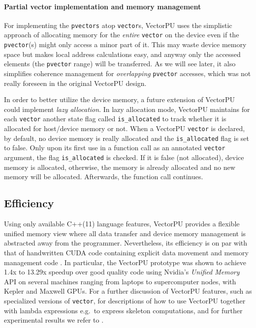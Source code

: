 \paragraph{Partial vector implementation and memory management}
For implementing the \texttt{pvectors} atop \texttt{vector}s, 
VectorPU uses the simplistic approach of allocating memory for
the \emph{entire} \texttt{vector} on the device 
even if the \texttt{pvector}(s) might only
access a minor part of it. This may waste device memory space 
but makes local address calculations easy, and anyway only
the accessed elements (the \texttt{pvector} range) will be transferred.
As we will see later, it also simplifies coherence management
for \emph{overlapping} \texttt{pvector} accesses, which was not 
really foreseen 	in the original VectorPU design.

In order to better utilize the device memory,
a future extension of VectorPU could implement 
\emph{lazy allocation}.
In lazy allocation mode, VectorPU maintains for each 
\texttt{vector} another state
flag called \texttt{is\_allocated}
to track whether it is allocated for host/device memory or not.
When a VectorPU \texttt{vector} is declared,
by default, no device memory is really allocated and the \texttt{is\_allocated} flag is set to false.
Only upon its first use in a function call as an
annotated \texttt{vector} argument,
the flag \texttt{is\_allocated} is checked.
If it is false (not allocated), device memory is allocated,
otherwise, the memory is already allocated and no new memory will be allocated.
Afterwards, the function call continues.

\subsection{Efficiency}

Using only available C++(11) language features, 
VectorPU provides a flexible unified memory
view where all data transfer and device memory management
is abstracted away from the programmer. Nevertheless,
its efficiency is on par with that of handwritten CUDA code
containing explicit data movement and memory management code
\cite{VectorPU-2017}.
In particular, the VectorPU prototype was shown to
achieve 1.4x to 13.29x speedup over good quality
code using Nvidia's \textit{Unified Memory} API
on several machines ranging from laptops to supercomputer nodes,
with Kepler and Maxwell GPUs. For a further discussion of
VectorPU features, such as
specialized versions of \verb-vector-, for descriptions
of how to use VectorPU together with lambda expressions 
e.g.\ to express skeleton computations, and for further
experimental results 
we refer to \cite{VectorPU-2017}.
